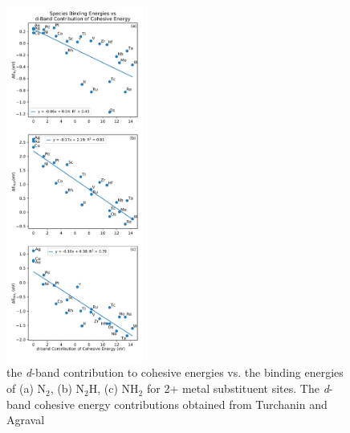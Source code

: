 



\begin{figure}
    \centering
    \includegraphics[width=0.4\textwidth]{Images/species_cohesive.pdf}
    \caption{the \textit{d}-band contribution to cohesive energies vs. the binding energies of (a) N$_2$, (b) N$_2$H, (c) NH$_2$ for 2+ metal substituent sites. The \textit{d}-band cohesive energy contributions obtained from Turchanin and Agraval \cite{Turchanin_2008}}
    \label{fig:cohesive}
\end{figure}




